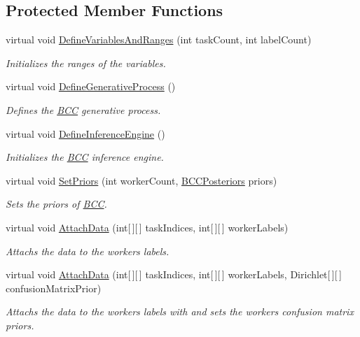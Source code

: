 \subsection*{Protected Member Functions}
\begin{DoxyCompactItemize}
\item 
virtual void \hyperlink{class_crowdsourcing_models_1_1_b_c_c_a3b4e301c3101dc790850548006d3aac8}{Define\+Variables\+And\+Ranges} (int task\+Count, int label\+Count)
\begin{DoxyCompactList}\small\item\em Initializes the ranges of the variables. \end{DoxyCompactList}\item 
virtual void \hyperlink{class_crowdsourcing_models_1_1_b_c_c_a0a4a80dc6093a006c87e43dcbf29c463}{Define\+Generative\+Process} ()
\begin{DoxyCompactList}\small\item\em Defines the \hyperlink{class_crowdsourcing_models_1_1_b_c_c}{B\+C\+C} generative process. \end{DoxyCompactList}\item 
virtual void \hyperlink{class_crowdsourcing_models_1_1_b_c_c_ab167badeccdb1951f97b6ed5b3b4dcd6}{Define\+Inference\+Engine} ()
\begin{DoxyCompactList}\small\item\em Initializes the \hyperlink{class_crowdsourcing_models_1_1_b_c_c}{B\+C\+C} inference engine. \end{DoxyCompactList}\item 
virtual void \hyperlink{class_crowdsourcing_models_1_1_b_c_c_ad08c9c0b6592cf6559118a68b56cfd07}{Set\+Priors} (int worker\+Count, \hyperlink{class_crowdsourcing_models_1_1_b_c_c_posteriors}{B\+C\+C\+Posteriors} priors)
\begin{DoxyCompactList}\small\item\em Sets the priors of \hyperlink{class_crowdsourcing_models_1_1_b_c_c}{B\+C\+C}. \end{DoxyCompactList}\item 
virtual void \hyperlink{class_crowdsourcing_models_1_1_b_c_c_af3806b7091a6bcc0116e3c8619d42daf}{Attach\+Data} (int\mbox{[}$\,$\mbox{]}\mbox{[}$\,$\mbox{]} task\+Indices, int\mbox{[}$\,$\mbox{]}\mbox{[}$\,$\mbox{]} worker\+Labels)
\begin{DoxyCompactList}\small\item\em Attachs the data to the workers labels. \end{DoxyCompactList}\item 
virtual void \hyperlink{class_crowdsourcing_models_1_1_b_c_c_ab40b3e7f5bd90c85672fb927a16f5fd6}{Attach\+Data} (int\mbox{[}$\,$\mbox{]}\mbox{[}$\,$\mbox{]} task\+Indices, int\mbox{[}$\,$\mbox{]}\mbox{[}$\,$\mbox{]} worker\+Labels, Dirichlet\mbox{[}$\,$\mbox{]}\mbox{[}$\,$\mbox{]} confusion\+Matrix\+Prior)
\begin{DoxyCompactList}\small\item\em Attachs the data to the workers labels with and sets the workers\textquotesingle{} confusion matrix priors. \end{DoxyCompactList}\end{DoxyCompactItemize}

